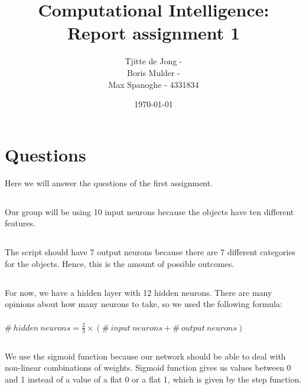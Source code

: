 \documentclass{scrartcl}
\begin{document}
\title{Computational Intelligence:
\\Report assignment 1}
\date{\today{}}

\author{
    \begin{tabular}{l r}
    	\\Tjitte de Jong - 
	\\Boris Mulder - 
        \\Max Spanoghe - 4331834
            \end{tabular}
  }
  
  \maketitle \thispagestyle{empty} \pagebreak
  
  \section{Questions}
  Here we will answer the questions of the first assignment.
  
  \subsection{}
  Our group will be using 10 input neurons because the objects have ten different features.
  
  \subsection{}
  The script should have 7 output neurons because there are 7 different categories for the objects.
  Hence, this is the amount of possible outcomes.
  
  \subsection{}
  For now, we have a hidden layer with 12 hidden neurons. There are many opinions about how many neurons to take, so we used the following formula: \\ \\ $\# \:hidden \:neurons = \frac{2} {3} \times (\# \:input \:neurons + \# \:output \:neurons) $
  
  \subsection{}
  We use the sigmoid function because our network should be able to deal with non-linear combinations of weights. Sigmoid function gives us values between 0 and 1 instead of a value of a flat 0 or a flat 1, which is given by the step function.
  
\end{document}
